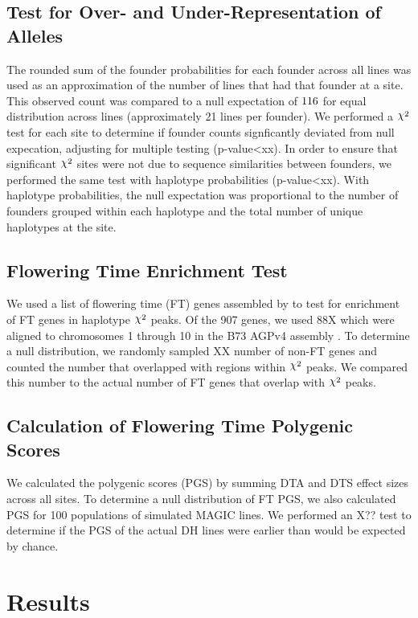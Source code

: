 \documentclass[article,9pt,twocolumn,twoside]{rilabRxiv}
\DeclareRobustCommand{\rchi}{{\mathpalette\irchi\relax}}
\newcommand{\irchi}[2]{\raisebox{\depth}{$#1\chi$}} %
\begin{document}
\subsection{Test for Over- and Under-Representation of Alleles}
The rounded sum of the founder probabilities for each founder across all lines was used as an approximation of the number of lines that had that founder at a site.
This observed count was compared to a null expectation of $1\/16$ for equal distribution across lines (approximately 21 lines per founder).
We performed a $\rchi^2$ test for each site to determine if founder counts signficantly deviated from null expecation, adjusting for multiple testing (p-value<xx).
In order to ensure that significant $\rchi^2$ sites were not due to sequence similarities between founders, we performed the same test with haplotype probabilities (p-value<xx).
With haplotype probabilities, the null expectation was proportional to the number of founders grouped within each haplotype and the total number of unique haplotypes at the site.

\subsection{Flowering Time Enrichment Test}
We used a list of flowering time (FT) genes assembled by \citep{Li5} to test for enrichment of FT genes in haplotype $\rchi^2$ peaks.
Of the 907 genes, we used 88X which were aligned to chromosomes 1 through 10 in the B73 AGPv4 assembly \cite{Jiao}.
To determine a null distribution, we randomly sampled XX number of non-FT genes and counted the number that overlapped with regions within $\rchi^2$ peaks.
We compared this number to the actual number of FT genes that overlap with $\rchi^2$ peaks.

\subsection{Calculation of Flowering Time Polygenic Scores}
We calculated the polygenic scores (PGS) by summing DTA and DTS effect sizes across all sites.
To determine a null distribution of FT PGS, we also calculated PGS for 100 populations of simulated MAGIC lines.
We performed an X?? test to determine if the PGS of the actual DH lines were earlier than would be expected by chance.

\section{Results}
\end{document}
